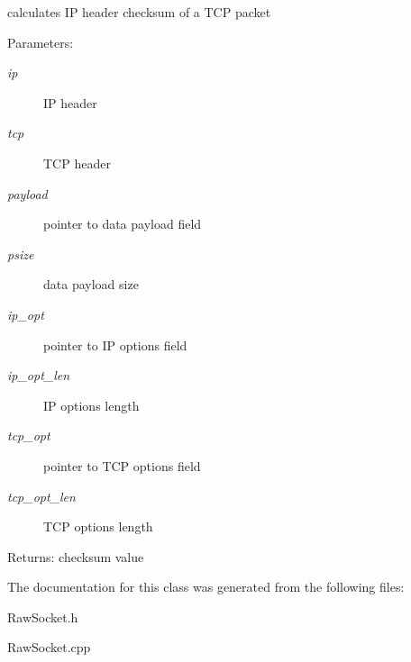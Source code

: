 calculates IP header checksum of a TCP packet 

\begin{Desc}
\item[Parameters:]
\begin{description}
\item[{\em ip}]IP header \item[{\em tcp}]TCP header \item[{\em payload}]pointer to data payload field \item[{\em psize}]data payload size \item[{\em ip\_\-opt}]pointer to IP options field \item[{\em ip\_\-opt\_\-len}]IP options length \item[{\em tcp\_\-opt}]pointer to TCP options field \item[{\em tcp\_\-opt\_\-len}]TCP options length \end{description}
\end{Desc}
\begin{Desc}
\item[Returns:]checksum value \end{Desc}


The documentation for this class was generated from the following files:\begin{CompactItemize}
\item 
RawSocket.h\item 
RawSocket.cpp\end{CompactItemize}
